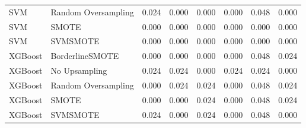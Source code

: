 \begin{tabular}{llllllll}
                         SVM & Random Oversampling & 0.024 &                     0.000 &                 0.000 &                  0.000 &                                   0.048 &     0.000 \\
                         SVM &               SMOTE & 0.000 &                     0.000 &                 0.000 &                  0.000 &                                   0.000 &     0.000 \\
                         SVM &            SVMSMOTE & 0.000 &                     0.000 &                 0.000 &                  0.000 &                                   0.000 &     0.000 \\
                     XGBoost &     BorderlineSMOTE & 0.000 &                     0.000 &                 0.000 &                  0.000 &                                   0.048 &     0.024 \\
                     XGBoost &       No Upsampling & 0.024 &                     0.024 &                 0.000 &                  0.024 &                                   0.024 &     0.000 \\
                     XGBoost & Random Oversampling & 0.000 &                     0.024 &                 0.024 &                  0.000 &                                   0.048 &     0.024 \\
                     XGBoost &               SMOTE & 0.000 &                     0.000 &                 0.024 &                  0.000 &                                   0.048 &     0.024 \\
                     XGBoost &            SVMSMOTE & 0.024 &                     0.000 &                 0.024 &                  0.000 &                                   0.048 &     0.000 \\
\bottomrule
\end{tabular}
